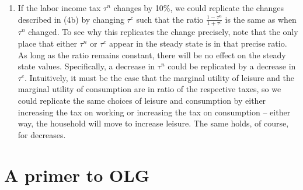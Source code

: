 \documentclass[10pt]{article}
\begin{document}
\begin{enumerate}
	\item If the labor income tax $\tau^n$ changes by 10\%, we could replicate the changes described in (4b) by changing $\tau^c$ such that the ratio $\frac{1-\tau^n}{1+\tau^c}$ is the same as when $\tau^n$ changed. To see why this replicates the change precisely, note that the only place that either $\tau^n$ or $\tau^c$ appear in the steady state is in that precise ratio. As long as the ratio remains constant, there will be no effect on the steady state values. Specifically, a decrease in $\tau^n$ could be replicated by a decrease in $\tau^c$. Intuitively, it must be the case that the marginal utility of leisure and the marginal utility of consumption are in ratio of the respective taxes, so we could replicate the same choices of leisure and consumption by either increasing the tax on working or increasing the tax on consumption -- either way, the household will move to increase leisure. The same holds, of course, for decreases.
\end{enumerate}




\section*{A primer to OLG}
\end{document}
